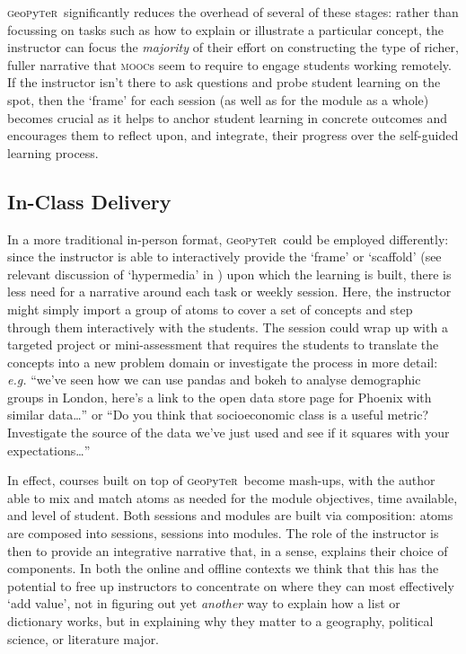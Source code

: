 \documentclass[letter, 11pt]{article}
\newcommand{\gp}{\textsc{g}eo\textsc{p}y\textsc{t}e\textsc{r}~\/}
\begin{document}
\gp significantly reduces the overhead of several of these stages: rather than
focussing on tasks such as how to explain or illustrate a particular concept,
the instructor can focus the \emph{majority} of their effort on constructing the
type of richer, fuller narrative that \textsc{mooc}s seem to require to engage
students working remotely. If the instructor isn't there to ask questions and
probe student learning on the spot, then the `frame' for each session (as well
as for the module as a whole) becomes crucial as it helps to anchor student
learning in concrete outcomes and encourages them to reflect upon, and
integrate, their progress over the self-guided learning process.

\subsection{In-Class Delivery}\label{in-class-delivery}

In a more traditional in-person format, \gp could be employed differently: since
the instructor is able to interactively provide the `frame' or `scaffold' (see
relevant discussion of `hypermedia' in \citealp{Azevedo2008}) upon which the
learning is built, there is less need for a narrative around each task or weekly
session. Here, the instructor might simply import a group of atoms to cover a
set of concepts and step through them interactively with the students. The
session could wrap up with a targeted project or mini-assessment that requires
the students to translate the concepts into a new problem domain or investigate
the process in more detail: \emph{e.g.} ``we've seen how we can use pandas and
bokeh to analyse demographic groups in London, here's a link to the open data
store page for Phoenix with similar data\ldots{}'' or ``Do you think that
socioeconomic class is a useful metric? Investigate the source of the data we've
just used and see if it squares with your expectations\ldots{}''

In effect, courses built on top of \gp become mash-ups, with the author able to
mix and match atoms as needed for the module objectives, time available, and
level of student. Both sessions and modules are built via composition: atoms are
composed into sessions, sessions into modules. The role of the instructor is
then to provide an integrative narrative that, in a sense, explains their choice
of components. In both the online and offline contexts we think that this has
the potential to free up instructors to concentrate on where they can most
effectively `add value', not in figuring out yet \emph{another} way to explain
how a list or dictionary works, but in explaining why they matter to a
geography, political science, or literature major.
\end{document}
